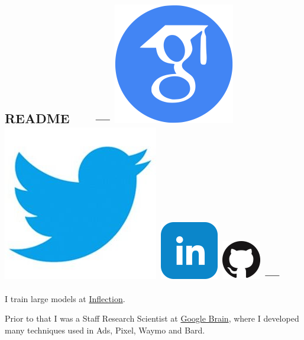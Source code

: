 \documentclass{article}
\begin{document}
\subsection*{README \ \ \ --- \protect
\href{https://scholar.google.com/citations?user=IMkVH_8AAAAJ&hl=en}{\includegraphics[natwidth=22, natheight=22]{img/google-scholar.png}}
\href{https://twitter.com/Hanxiao_6}{\includegraphics[natwidth=22, natheight=22]{img/twitter.jpg}}
\href{https://www.linkedin.com/in/hanxiao-liu-17194a4a/}{\includegraphics[natwidth=22, natheight=22]{img/linkedin.png}}
\href{https://github.com/quark0}{\includegraphics[natwidth=22, natheight=22]{img/GitHub-Mark-64px.png}}
---
}
\noindent I train large models at \href{https://inflection.ai}{Inflection}.

\noindent Prior to that I was a Staff Research Scientist at \href{https://ai.google/research/teams/brain}{Google Brain}, where I developed many techniques used in Ads, Pixel, Waymo and Bard.
\end{document}
